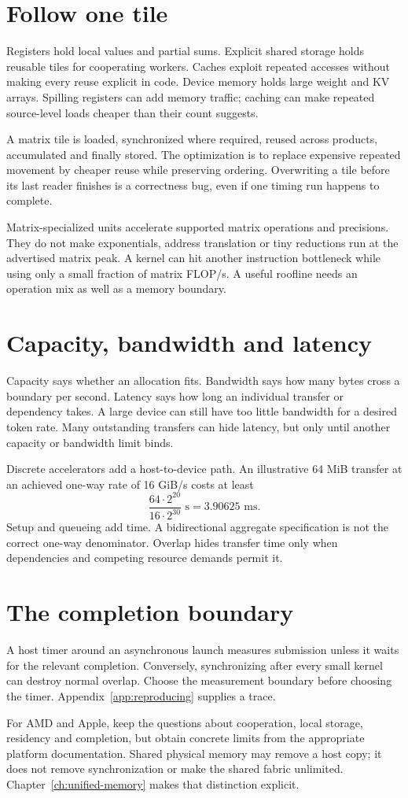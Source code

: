 \section{Follow one tile}
Registers hold local values and partial sums. Explicit shared storage holds
reusable tiles for cooperating workers. Caches exploit repeated accesses
without making every reuse explicit in code. Device memory holds large
weight and KV arrays. Spilling registers can add memory traffic; caching
can make repeated source-level loads cheaper than their count suggests.

A matrix tile is loaded, synchronized where required, reused across
products, accumulated and finally stored. The optimization is to replace
expensive repeated movement by cheaper reuse while preserving ordering.
Overwriting a tile before its last reader finishes is a correctness bug,
even if one timing run happens to complete.

Matrix-specialized units accelerate supported matrix operations and
precisions. They do not make exponentials, address translation or tiny
reductions run at the advertised matrix peak. A kernel can hit another
instruction bottleneck while using only a small fraction of matrix FLOP/s.
A useful roofline needs an operation mix as well as a memory boundary.

\section{Capacity, bandwidth and latency}
Capacity says whether an allocation fits. Bandwidth says how many bytes
cross a boundary per second. Latency says how long an individual transfer
or dependency takes. A large device can still have too little bandwidth
for a desired token rate. Many outstanding transfers can hide latency,
but only until another capacity or bandwidth limit binds.

Discrete accelerators add a host-to-device path. An illustrative 64 MiB
transfer at an achieved one-way rate of 16 GiB/s costs at least
\[
 \frac{64\cdot2^{20}}{16\cdot2^{30}}\text{ s}=3.90625\text{ ms}.
\]
Setup and queueing add time. A bidirectional aggregate specification is
not the correct one-way denominator. Overlap hides transfer time only
when dependencies and competing resource demands permit it.

\section{The completion boundary}
A host timer around an asynchronous launch measures submission unless it
waits for the relevant completion. Conversely, synchronizing after every
small kernel can destroy normal overlap. Choose the measurement boundary
before choosing the timer. Appendix~\ref{app:reproducing} supplies a trace.

For AMD and Apple, keep the questions about cooperation, local storage,
residency and completion, but obtain concrete limits from the appropriate
platform documentation. Shared physical memory may remove a host copy;
it does not remove synchronization or make the shared fabric unlimited.
Chapter~\ref{ch:unified-memory} makes that distinction explicit.
